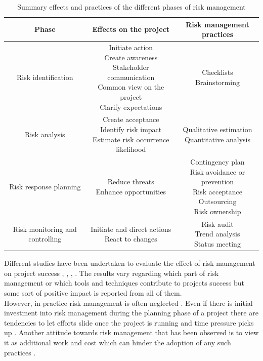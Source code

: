 \begin{table}[H]
	\centering
	\caption{Summary effects and practices of the different phases of risk management}
\begin{tabular}{c|c|c} \toprule 
Phase  & Effects on the project & Risk management practices \\ \midrule
 Risk identification & 
 \makecell{Initiate action\\
 	Create awareness\\
 	Stakeholder communication\\
 	Common view on the project\\ 
 	Clarify expectations}&
 \makecell{Checklists\\
 	Brainstorming}\\ \hline
 Risk analysis &
 \makecell{Create acceptance \\
 	Identify risk impact\\
 	Estimate risk occurrence likelihood }&
 \makecell{Qualitative estimation\\
 	Quantitative analysis}\\ \hline
 Risk response planning &
 \makecell{Reduce threats\\
 	Enhance opportunities }&
 \makecell{Contingency plan\\
 	Risk avoidance or prevention\\
 	Risk acceptance\\
 	Outsourcing\\
 	Risk ownership }\\  \hline
 Risk monitoring and controlling &
 \makecell{Initiate and direct actions\\
 	React to changes }&
 \makecell{Risk audit\\
 	Trend analysis\\
 	Status meeting 	
 } \\ \hline
	\end{tabular}
	\label{tab:riskmanagemensummery}
\end{table}
Different studies have been undertaken to evaluate the effect of risk management on project success \cite{debakkerDoesRiskManagement2010}, \cite{didragaRoleEffectsRisk2013}, \cite{kwakProjectRiskManagement2004}, \cite{juniorUnderstandingImpactProject2013}. The results vary regarding which part of risk management or which tools and techniques contribute to projects success but some sort of positive impact is reported from all of them. \\
However, in practice risk management is often neglected \cite{kwakProjectRiskManagement2004}. Even if there is initial investment into risk management during the planning phase of a project there are tendencies to let efforts slide once the project is running and time pressure picks up \cite{peixotoProjectRiskManagement2014}. Another attitude towards risk management that has been observed is to view it as additional work and cost which can hinder the adoption of any such practices \cite{teschITProjectRisk2007}.\\
